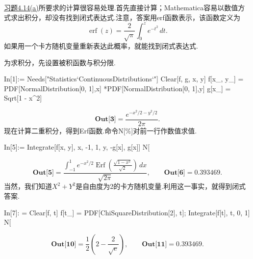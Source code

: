 \begin{example}[正态概率]\label{ex:12.6.4}
\hyperref[exercise:4.14]{习题4.14(a)}所要求的计算很容易处理.首先直接计算；Mathematica容易以数值方式求出积分，却没有找到闭式表达式.注意，答案用erf函数表示，该函数定义为
$$\operatorname{erf}(z)=\frac{2}{\sqrt{\pi}}\int_0^z e^{-t^2}\,dt.$$
如果用一个卡方随机变量重新表达此概率，就能找到闭式表达式.

为求积分，先设置被积函数与积分限.
\begin{sourcecode}
In[1]:= Needs["Statistics`ContinuousDistributions`"]
Clear[f, g, x, y]
f[x_, y_] = PDF[NormalDistribution[0, 1],x]
*PDF[NormalDistribution[0, 1],y]
g[x_] = Sqrt[1 - x^2]
\end{sourcecode}
$$\textbf{Out[3]}=\frac{e^{-x^2/2-y^2/2}}{2\pi}.$$
现在计算二重积分，得到Erf函数.命令N[\%]对前一行作数值求值.
\begin{sourcecode}
In[5]:= Integrate[f[x, y], {x, -1, 1}, {y, -g[x], g[x]}]
N[%
\end{sourcecode}
$$\textbf{Out[5]}=\frac{\int_{-1}^1e^{-x^2/2}\operatorname{Erf}\!\left(\frac{\sqrt{1-x^2}}{\sqrt2}\right)\,dx}{\sqrt{2\pi}},\qquad\textbf{Out[6]}=0.393469.$$
当然，我们知道$X^2+Y^2$是自由度为2的卡方随机变量.利用这一事实，就得到闭式答案.
\begin{sourcecode}
In[7]: = Clear[f, t]
f[t_] = PDF[ChiSquareDistribution[2], t];
Integrate[f[t], {t, 0, 1}]
N[%
\end{sourcecode}
$$\textbf{Out[10]}=\frac12\left(2-\frac{2}{\sqrt e}\right),\qquad\textbf{Out[11]}=0.393469.$$
\end{example}

\endgroup
